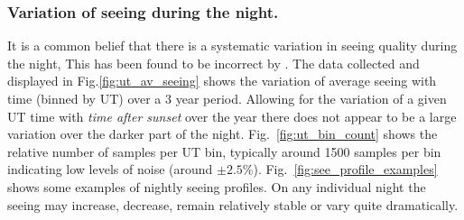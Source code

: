 {{%


\subsubsection{Variation of seeing during the night.}
It is a common belief that there is a systematic variation in seeing quality during the night, This has been found to be incorrect by \citet{munoz97nighttime}. The data collected and displayed in Fig.\ref{fig:ut_av_seeing} shows the variation of average seeing with time (binned by UT) over a 3 year period. Allowing for the variation of a given UT time with \emph{time after sunset} over the year there does not appear to be a large variation over the darker part of the night. Fig.~\ref{fig:ut_bin_count} shows the relative number of samples per UT bin, typically around 1500 samples per bin indicating low levels of noise (around $\pm 2.5$\%). Fig.~\ref{fig:see_profile_examples} shows some examples of nightly seeing profiles. On any individual night the seeing may increase, decrease, remain relatively stable or vary quite dramatically.




}}

